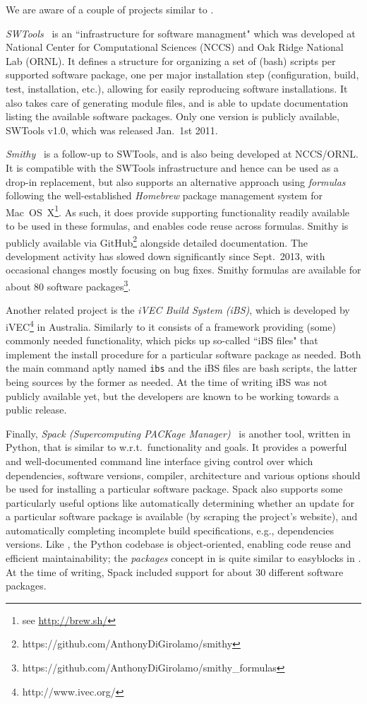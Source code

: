 We are aware of a couple of projects similar to \easybuild{}.

\emph{SWTools}~\cite{swtools, jones08} is an ``infrastructure for software
managment" which was developed at National Center for Computational Sciences (NCCS)
and Oak Ridge National Lab (ORNL). It defines a structure for organizing a set of
(bash) scripts per supported software package, one per major installation step
(configuration, build, test, installation, etc.), allowing for easily reproducing 
software installations. It also takes care of generating module files, and is
able to update documentation listing the available software packages.
Only one version is publicly available, SWTools v1.0, which was released Jan.~1st 2011.

\emph{Smithy}~\cite{smithy} is a follow-up to SWTools, and is also being developed
at NCCS/ORNL. It is compatible with the SWTools infrastructure and hence can be
used as a drop-in replacement, but also supports an alternative approach using
\emph{formulas} following the well-established \emph{Homebrew} package management 
system for Mac~OS~X\footnote{see \url{http://brew.sh/}}. As such, it does provide
supporting functionality readily available to be used in these formulas, and enables
code reuse across formulas. Smithy is publicly available via
GitHub\footnote{https://github.com/AnthonyDiGirolamo/smithy} alongside detailed
documentation. The development activity has slowed down significantly since
Sept.~2013, with occasional changes mostly focusing on bug fixes.
Smithy formulas are available for about 80 software
packages\footnote{https://github.com/AnthonyDiGirolamo/smithy\_formulas}.

Another related project is the \emph{iVEC Build System (iBS)}, which is developed 
by iVEC\footnote{http://www.ivec.org/} in Australia. Similarly to \easybuild{}
it consists of a framework providing (some) commonly needed functionality, which
picks up so-called ``iBS files" that implement the install procedure for a 
particular software package as needed. Both the main command aptly named \texttt{ibs}
and the iBS files are bash scripts, the latter being sources by the former as needed.
At the time of writing iBS was not publicly available yet, but the developers are
known to be working towards a public release.

Finally, \emph{Spack (Supercomputing PACKage Manager)}~\cite{spack} is another
tool, written in Python, that is similar to \easybuild{} w.r.t.\ functionality and
goals. It provides a powerful and well-documented command line interface giving
control over which dependencies, software versions, compiler, architecture and
various options should be used for installing a particular software package.
Spack also supports some particularly useful options like automatically determining
whether an update for a particular software package is available
(by scraping the project's website), and automatically completing
incomplete build specifications, e.g., dependencies versions. Like
\easybuild{}, the Python codebase is object-oriented, enabling code reuse and
efficient maintainability; the \emph{packages} concept in is quite similar to
easyblocks in \easybuild{}. At the time of writing, Spack included support for about
30 different software packages.


